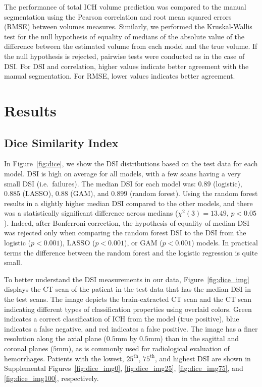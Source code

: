 \documentclass{elsarticle_nonatbib}\usepackage[]{graphicx}\usepackage[]{color}
\begin{document}
The performance of total ICH volume prediction was compared to the manual segmentation using the Pearson correlation and root mean squared errors (RMSE) between volumes measures.  Similarly, we performed the Kruskal-Wallis test for the null hypothesis of equality of medians of the absolute value of the difference between the estimated volume from each model and the true volume.  If the null hypothesis is rejected, pairwise tests were conducted as in the case of DSI.  For DSI and correlation, higher values indicate better agreement with the manual segmentation.  For RMSE, lower values indicates better agreement.


\section{Results}

\subsection{Dice Similarity Index}
In Figure~\ref{fig:dice}, we show the DSI distributions based on the test data for each model.  DSI is high on average for all models, with a few scans having a very small DSI (i.e.~failures).   The median DSI for each model was: $0.89$ (logistic), $0.885$  (LASSO), $0.88$ (GAM), and $0.899$ (random forest). 
Using the random forest results in a slightly higher median DSI compared to the other models, and there was a statistically significant difference across medians ($\chi^{2}(3)=13.49$, $p < 0.05$).  Indeed, after Bonferroni correction, the hypothesis of equality of median DSI was rejected only when comparing the random forest DSI to the DSI from the logistic ($p < 0.001$), LASSO ($p < 0.001$), or GAM ($p < 0.001$) models.  In practical terms the difference between the random forest and the logistic regression is quite small.

To better understand the DSI measurements in our data, Figure~\ref{fig:dice_img} displays the CT scan of the patient in the test data that has the median DSI in the test scans. The image depicts the brain-extracted CT scan and the CT scan indicating different types of classification properties using overlaid colors.  Green indicates a correct classification of ICH from the model (true positive), blue indicates a false negative, and red indicates a false positive.  The image has a finer resolution along the axial plane ($0.5$mm by $0.5$mm) than in the sagittal and coronal planes ($5$mm), as is commonly used for radiological evaluation of hemorrhages.  Patients with the lowest, $25^{\text{th}}$, $75^{\text{th}}$, and highest DSI are shown in Supplemental Figures~\ref{fig:dice_img0}, \ref{fig:dice_img25}, \ref{fig:dice_img75}, and \ref{fig:dice_img100}, respectively.
\end{document}
